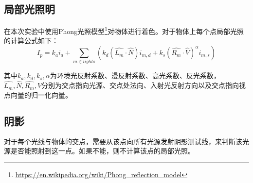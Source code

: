 \subsection {局部光照明}
在本次实验中使用Phong光照模型\footnote{\url{https://en.wikipedia.org/wiki/Phong_reflection_model}}对物体进行着色。对于物体上每个点局部光照的计算公式如下：
\[ I_{p}=k_{a}i_{a}+\sum_{m\in lights} (k_{d}(\hat{L_{m}}\cdot\hat{N})i_{m,d}+k_{s}(\hat{R_{m}}\cdot\hat{V})^{\alpha}i_{m,s}) \]

其中$k_{a},k_{d},k_{s},\alpha$为环境光反射系数、漫反射系数、高光系数、反光系数，$\hat{L_{m}},\hat{N},\hat{R_{m}},\hat{V}$分别为交点指向光源、交点处法向、入射光反射方向以及交点指向视点向量的归一化向量。

\subsection {阴影}
对于每个光线与物体的交点，需要从该点向所有光源发射阴影测试线，来判断该光源是否能照射到这一点。如果不能，则不计算该点的局部光照。
